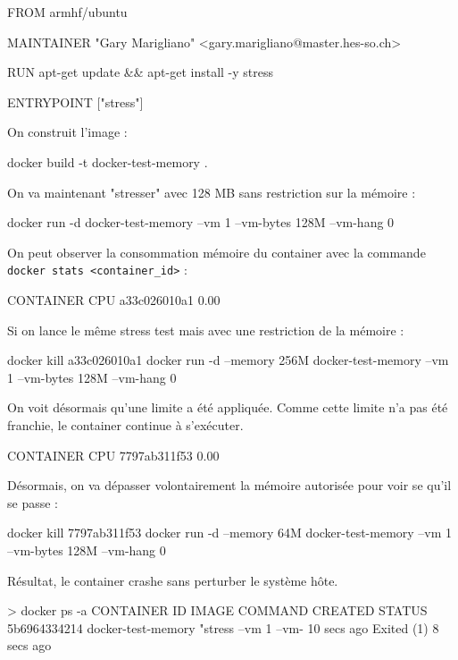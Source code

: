 \documentclass[11pt,a4paper,oneside]{report}
\newcommand{\code}[1]{\texttt{#1}}
\begin{document}
\begin{textcode}
FROM armhf/ubuntu

MAINTAINER "Gary Marigliano" <gary.marigliano@master.hes-so.ch>

RUN apt-get update && apt-get install -y stress

ENTRYPOINT ["stress"]
\end{textcode}

On construit l'image :
\begin{bashcode}
docker build -t docker-test-memory .
\end{bashcode}

On va maintenant "stresser" avec 128 MB sans restriction sur la mémoire :
\begin{textcode}
docker run -d docker-test-memory --vm 1 --vm-bytes 128M --vm-hang 0
\end{textcode}

On peut observer la consommation mémoire du container avec la commande \break \code{docker stats <container\_id>} :

\begin{bashcode}
CONTAINER           CPU %
a33c026010a1        0.00%
\end{bashcode}

Si on lance le même stress test mais avec une restriction de la mémoire :
\begin{textcode}
docker kill a33c026010a1
docker run -d --memory 256M docker-test-memory --vm 1 --vm-bytes 128M --vm-hang 0
\end{textcode}

On voit désormais qu'une limite a été appliquée. Comme cette limite n'a pas été franchie, le container continue à s'exécuter.

\begin{textcode}
CONTAINER           CPU %
7797ab311f53        0.00%
\end{textcode}

Désormais, on va dépasser volontairement la mémoire autorisée pour voir se qu'il se passe :
\begin{textcode}
docker kill 7797ab311f53
docker run -d --memory 64M docker-test-memory --vm 1 --vm-bytes 128M --vm-hang 0
\end{textcode}

Résultat, le container crashe sans perturber le système hôte.
\begin{textcode}
> docker ps -a
CONTAINER ID  IMAGE               COMMAND               CREATED      STATUS
5b6964334214  docker-test-memory  "stress --vm 1 --vm-  10 secs ago  Exited (1) 8 secs ago
\end{textcode}
\end{document}
